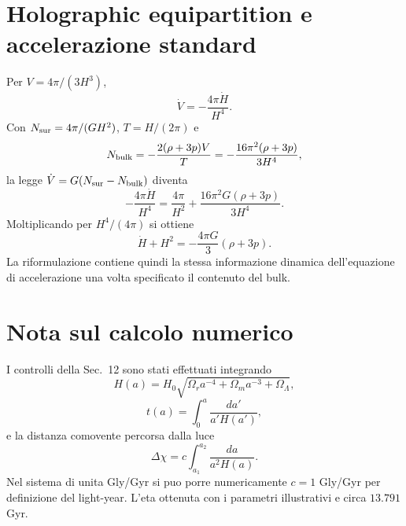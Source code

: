 \documentclass[11pt,a4paper]{article}
\begin{document}
\section{Holographic equipartition e accelerazione standard}

Per $V=4\pi/(3H^3)$,
\begin{equation}
 \dot V=-\frac{4\pi\dot H}{H^4}.
\end{equation}
Con $N_{\rm sur}=4\pi/(GH^2)$, $T=H/(2\pi)$ e
\begin{equation}
 N_{\rm bulk}=-\frac{2(\rho+3p)V}{T}
 =-\frac{16\pi^2(\rho+3p)}{3H^4},
\end{equation}
la legge $\dot V=G(N_{\rm sur}-N_{\rm bulk})$ diventa
\begin{equation}
 -\frac{4\pi\dot H}{H^4}=\frac{4\pi}{H^2}+\frac{16\pi^2G(\rho+3p)}{3H^4}.
\end{equation}
Moltiplicando per $H^4/(4\pi)$ si ottiene
\begin{equation}
 \dot H+H^2=-\frac{4\pi G}{3}(\rho+3p).
\end{equation}
La riformulazione contiene quindi la stessa informazione dinamica dell'equazione di accelerazione una volta specificato il contenuto del bulk.

\section{Nota sul calcolo numerico}

I controlli della Sec.~12 sono stati effettuati integrando
\begin{equation}
H(a)=H_0\sqrt{\Omega_r a^{-4}+\Omega_m a^{-3}+\Omega_\Lambda},
\end{equation}
\begin{equation}
t(a)=\int_0^a\frac{da'}{a'H(a')},
\end{equation}
e la distanza comovente percorsa dalla luce
\begin{equation}
\Delta\chi=c\int_{a_1}^{a_2}\frac{da}{a^2H(a)}.
\end{equation}
Nel sistema di unita Gly/Gyr si puo porre numericamente $c=1$ Gly/Gyr per definizione del light-year. L'eta ottenuta con i parametri illustrativi e circa $13.791$ Gyr.
\end{document}
